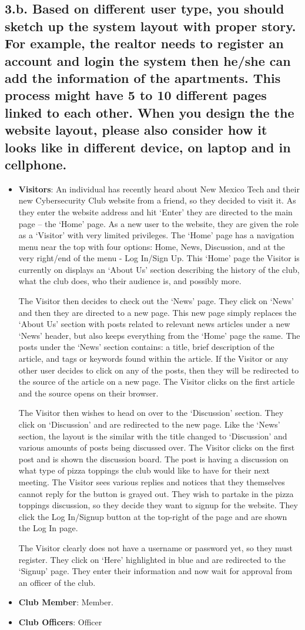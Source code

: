 \documentclass{article}
\begin{document}
\subsection{  3.b. Based on different user type, you should sketch up the system layout with proper story. For example, the realtor needs to register an account and login the system then he/she can add the information of the apartments. This process might have 5 to 10 different pages linked to each other. When you design the the website layout, please also consider how it looks like in different device, on laptop and in cellphone.}
\begin{itemize}
    \item \textbf{Visitors}: An individual has recently heard about New Mexico Tech and their new Cybersecurity Club website from a friend, so they decided to visit it.  As they enter the website address and hit ‘Enter’ they are directed to the main page – the ‘Home’ page.  As a new user to the website, they are given the role as a ‘Visitor’ with very limited privileges.  The ‘Home’ page has a navigation menu near the top with four options: Home, News, Discussion, and at the very right/end of the menu - Log In/Sign Up.  This ‘Home’ page the Visitor is currently on displays an ‘About Us’ section describing the history of the club, what the club does, who their audience is, and possibly more. 
\par The Visitor then decides to check out the ‘News’ page.  They click on ‘News’ and then they are directed to a new page.  This new page simply replaces the ‘About Us’ section with posts related to relevant news articles under a new ‘News’ header, but also keeps everything from the ‘Home’ page the same.  The posts under the ‘News’ section contains: a title, brief description of the article, and tags or keywords found within the article.  If the Visitor or any other user decides to click on any of the posts, then they will be redirected to the source of the article on a new page.  The Visitor clicks on the first article and the source opens on their browser.  
\par The Visitor then wishes to head on over to the ‘Discussion’ section.  They click on ‘Discussion’ and are redirected to the new page.  Like the ‘News’ section, the layout is the similar with the title changed to ‘Discussion’ and various amounts of posts being discussed over.  The Visitor clicks on the first post and is shown the discussion board.  The post is having a discussion on what type of pizza toppings the club would like to have for their next meeting.  The Visitor sees various replies and notices that they themselves cannot reply for the button is grayed out.  They wish to partake in the pizza toppings discussion, so they decide they want to signup for the website.  They click the Log In/Signup button at the top-right of the page and are shown the Log In page.
\par The Visitor clearly does not have a username or password yet, so they must register.  They click on ‘Here’ highlighted in blue and are redirected to the ‘Signup’ page.  They enter their information and now wait for approval from an officer of the club.

    \item \textbf{Club Member}: Member.
    \item \textbf{Club Officers}: Officer
\end{itemize}  
  
  
\end{document}
